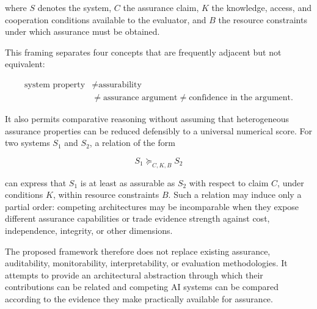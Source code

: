 where \(S\) denotes the system, \(C\) the assurance claim, \(K\) the knowledge, access,
and cooperation conditions available to the evaluator, and \(B\) the resource constraints under which assurance must be obtained.

This framing separates four concepts that are frequently adjacent but not equivalent:

\begin{equation}
  \begin{aligned}
    \text{system property}
     & \neq \text{assurability}       \\
     & \neq \text{assurance argument}
    \neq \text{confidence in the argument}.
  \end{aligned}
\end{equation}

It also permits comparative reasoning without assuming
that heterogeneous assurance properties can be reduced defensibly to a universal numerical score.
For two systems \(S_1\) and \(S_2\), a relation of the form

\begin{equation}
  S_1 \succeq_{C,K,B} S_2
\end{equation}

can express that \(S_1\) is at least as assurable as \(S_2\) with
respect to claim \(C\), under conditions \(K\),
within resource constraints \(B\). Such a relation may induce only a partial order:
competing architectures may be incomparable when they expose different assurance capabilities or trade evidence strength against cost, independence, integrity, or other dimensions.

The proposed framework therefore does not replace existing
assurance, auditability, monitorability, interpretability, or evaluation methodologies.
It attempts to provide an architectural abstraction through which their contributions can be related and competing AI systems
can be compared according to the evidence they make practically available for assurance.
